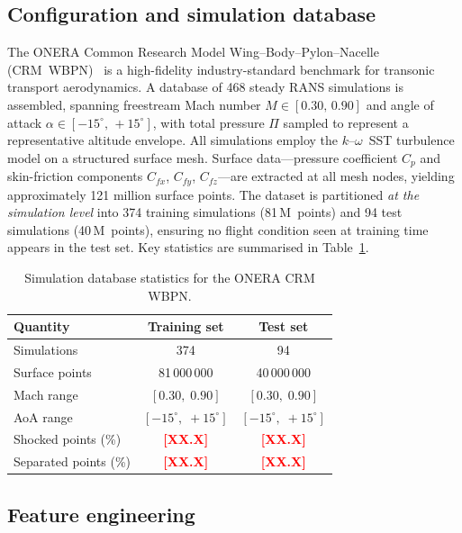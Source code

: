 \documentclass{WCCM-ECCOMAS_2026_Full_Paper}
\newcommand{\result}[1]{\textcolor{red}{\textbf{[#1]}}}
\begin{document}
\subsection{Configuration and simulation database}

The ONERA Common Research Model Wing--Body--Pylon--Nacelle
(CRM~WBPN)~\cite{Vassberg2008,Levy2013} is a high-fidelity
industry-standard benchmark for transonic transport aerodynamics.
A database of 468 steady RANS simulations is assembled, spanning
freestream Mach number $M \in [0.30,\,0.90]$ and angle of attack
$\alpha \in [-15^{\circ},\,+15^{\circ}]$, with total pressure $\Pi$
sampled to represent a representative altitude envelope.  All
simulations employ the $k$--$\omega$~SST turbulence model on a
structured surface mesh.  Surface data---pressure coefficient $C_p$
and skin-friction components $C_{fx}$, $C_{fy}$, $C_{fz}$---are
extracted at all mesh nodes, yielding approximately 121 million
surface points.  The dataset is partitioned \emph{at the simulation
level} into 374 training simulations (81\,M~points) and 94 test
simulations (40\,M~points), ensuring no flight condition seen at
training time appears in the test set.  Key statistics are summarised
in Table~\ref{tab:dataset}.

\begin{table}[ht]
\centering
\caption{Simulation database statistics for the ONERA CRM WBPN.}
\label{tab:dataset}
\begin{tabular}{lcc}
\toprule
\textbf{Quantity} & \textbf{Training set} & \textbf{Test set} \\
\midrule
Simulations        & 374                  & 94                \\
Surface points     & 81\,000\,000         & 40\,000\,000      \\
Mach range         & $[0.30,\;0.90]$      & $[0.30,\;0.90]$   \\
AoA range          & $[-15^{\circ},\;+15^{\circ}]$ & $[-15^{\circ},\;+15^{\circ}]$ \\
Shocked points (\%)   & \result{XX.X}     & \result{XX.X}     \\
Separated points (\%) & \result{XX.X}     & \result{XX.X}     \\
\bottomrule
\end{tabular}
\end{table}

\subsection{Feature engineering}
\end{document}
